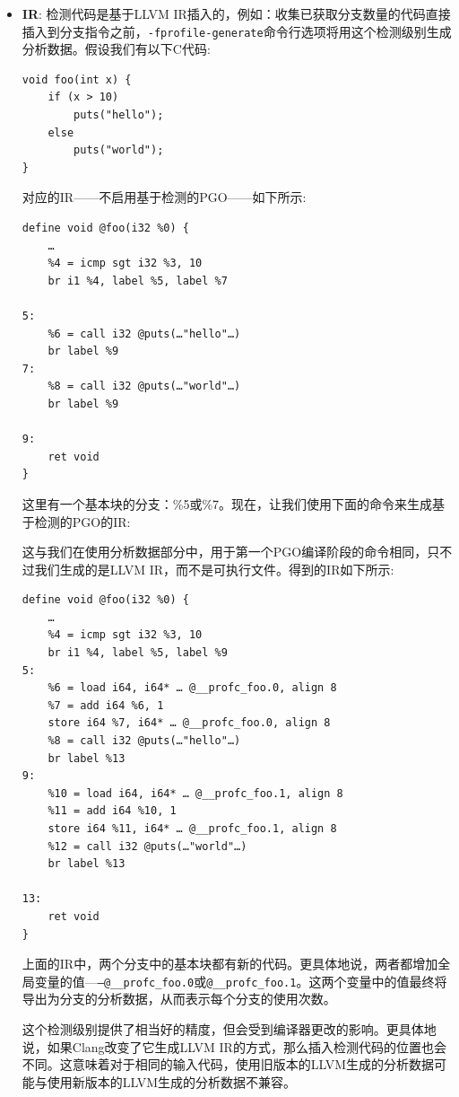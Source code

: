 \begin{itemize}
\item \textbf{IR}: 检测代码是基于LLVM IR插入的，例如：收集已获取分支数量的代码直接插入到分支指令之前，\texttt{-fprofile-generate}命令行选项将用这个检测级别生成分析数据。假设我们有以下C代码:

\begin{lstlisting}[style=styleCXX]
void foo(int x) {
	if (x > 10)
		puts("hello");
	else
		puts("world");
}
\end{lstlisting}

对应的IR——不启用基于检测的PGO——如下所示:

\begin{lstlisting}[style=styleCXX]
define void @foo(i32 %0) {
	…
	%4 = icmp sgt i32 %3, 10
	br i1 %4, label %5, label %7
	
5:
	%6 = call i32 @puts(…"hello"…)
	br label %9
7:
	%8 = call i32 @puts(…"world"…)
	br label %9
	
9:
	ret void
}
\end{lstlisting}

这里有一个基本块的分支：\%5或\%7。现在，让我们使用下面的命令来生成基于检测的PGO的IR:


这与我们在使用分析数据部分中，用于第一个PGO编译阶段的命令相同，只不过我们生成的是LLVM IR，而不是可执行文件。得到的IR如下所示:

\begin{lstlisting}[style=styleCXX]
define void @foo(i32 %0) {
	…
	%4 = icmp sgt i32 %3, 10
	br i1 %4, label %5, label %9
5:
	%6 = load i64, i64* … @__profc_foo.0, align 8
	%7 = add i64 %6, 1
	store i64 %7, i64* … @__profc_foo.0, align 8
	%8 = call i32 @puts(…"hello"…)
	br label %13
9:
	%10 = load i64, i64* … @__profc_foo.1, align 8
	%11 = add i64 %10, 1
	store i64 %11, i64* … @__profc_foo.1, align 8
	%12 = call i32 @puts(…"world"…)
	br label %13
	
13:
	ret void
}
\end{lstlisting}

上面的IR中，两个分支中的基本块都有新的代码。更具体地说，两者都增加全局变量的值—\texttt{—@\_\_profc\_foo.0}或\texttt{@\_\_profc\_foo.1}。这两个变量中的值最终将导出为分支的分析数据，从而表示每个分支的使用次数。

这个检测级别提供了相当好的精度，但会受到编译器更改的影响。更具体地说，如果Clang改变了它生成LLVM IR的方式，那么插入检测代码的位置也会不同。这意味着对于相同的输入代码，使用旧版本的LLVM生成的分析数据可能与使用新版本的LLVM生成的分析数据不兼容。


\end{itemize}
